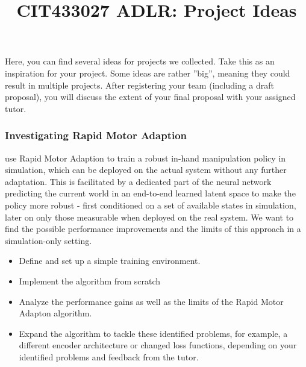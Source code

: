 \documentclass[a4paper]{article}
\title{CIT433027 ADLR: Project Ideas}
\author{}
\begin{document}
\maketitle

Here, you can find several ideas for projects we collected.
Take this as an inspiration for your project.
Some ideas are rather ”big”, meaning they could result in multiple projects.
After registering your team (including a draft proposal), you will discuss the extent of your final proposal with your assigned tutor.

\subsubsection{Investigating Rapid Motor Adaption}
\citet{Qi2022inhand} use Rapid Motor Adaption to train a robust in-hand manipulation policy in simulation, which can be deployed on the actual system without any further adaptation.
This is facilitated by a dedicated part of the neural network predicting the current world in an end-to-end learned latent space to make the policy more robust - first conditioned on a set of available states in simulation, later on only those measurable when deployed on the real system.
We want to find the possible performance improvements and the limits of this approach in a simulation-only setting.
\begin{itemize}
  \item Define and set up a simple training environment.
  \item Implement the algorithm from scratch
  \item Analyze the performance gains as well as the limits of the Rapid Motor Adapton algorithm.
  \item Expand the algorithm to tackle these identified problems, for example, a different encoder architecture or changed loss functions, depending on your identified problems and feedback from the tutor.
\end{itemize}

\end{document}
